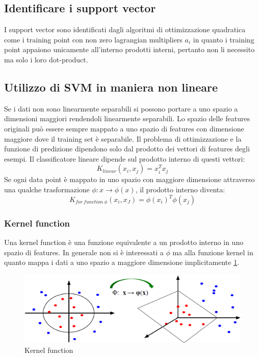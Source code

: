 	\subsection{Identificare i support vector}
	I support vector sono identificati dagli algoritmi di ottimizzazione quadratica come i training point con non zero lagrangian multipliers $a_i$ in quanto i training point appaiono unicamente all'interno prodotti interni, pertanto non li necessito ma solo i loro dot-product.
	
	\subsection{Utilizzo di SVM in maniera non lineare}
	Se i dati non sono linearmente separabili si possono portare a uno spazio a dimensioni maggiori rendendoli linearmente separabili.
	Lo spazio delle features originali pu\`o essere sempre mappato a uno spazio di features con dimensione maggiore dove il training set \`e separabile.
	Il problema di ottimizzazione e la funzione di predizione dipendono solo dal prodotto dei vettori di features degli esempi.
	Il classificatore lineare dipende sul prodotto interno di questi vettori:
	$$K_{linear}(x_i,x_j) = x_i^Tx_j$$
	Se ogni data point \`e mappato in uno spazio con maggiore dimensione attraverso una qualche trasformazione $\phi:x\rightarrow\phi(x)$, il prodotto interno diventa:
	$$K_{for\ function\ \phi}(x_i,x_J)= \phi(x_i)^T\phi(x_j)$$

		\subsubsection{Kernel function}
		Una kernel function \`e una funzione equivalente a un prodotto interno in uno spazio di features.
		In generale non si \`e interessati a $\phi$ ma alla funzione kernel in quanto mappa i dati a uno spazio a maggiore dimensione implicitamente \ref{fig:chapter10-02}.
		
		\begin{figure}
			\centering
			\includegraphics[width=0.6\linewidth]{imgs/chapter10/img2}
			\caption{Kernel function}
			\label{fig:chapter10-02}
		\end{figure}
		
